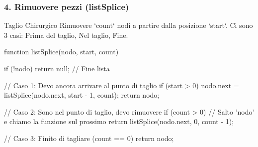 \subsubsection{4. Rimuovere pezzi (listSplice)}
\begin{concept}{Taglio Chirurgico}
Rimuovere `count` nodi a partire dalla posizione `start`.
Ci sono 3 casi: Prima del taglio, Nel taglio, Fine.
\end{concept}
\begin{jsbox}
function listSplice(nodo, start, count) {
    if (!nodo) return null; // Fine lista
    
    // Caso 1: Devo ancora arrivare al punto di taglio
    if (start > 0) {
        nodo.next = listSplice(nodo.next, start - 1, count);
        return nodo;
    }
    
    // Caso 2: Sono nel punto di taglio, devo rimuovere
    if (count > 0) {
        // Salto 'nodo' e chiamo la funzione sul prossimo
        return listSplice(nodo.next, 0, count - 1);
    }
    
    // Caso 3: Finito di tagliare (count == 0)
    return nodo;
}
\end{jsbox}
